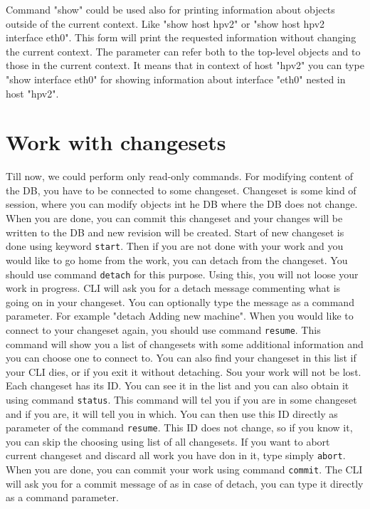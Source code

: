 \documentclass[deska]{subfiles}
\begin{document}
Command "show" could be used also for printing information about objects outside of the current context. Like "show host hpv2" or
"show host hpv2 interface eth0". This form will print the requested information without changing the current context.
The parameter can refer both to the top-level objects and to those in the current context. It means that in context of host "hpv2" you can type "show interface eth0"
for showing information about interface "eth0" nested in host "hpv2".

\section{Work with changesets}

Till now, we could perform only read-only commands. For modifying content of the DB, you have to be connected to some changeset.
Changeset is some kind of session, where you can modify objects int he DB where the DB does not change. When you are done,
you can commit this changeset and your changes will be written to the DB and new revision will be created.
Start of new changeset is done using keyword {\tt start}. Then if you are not done with your work and you would like to
go home from the work, you can detach from the changeset. You should use command {\tt detach} for this purpose. Using
this, you will not loose your work in progress. CLI will ask you for a detach message commenting what is going on in
your changeset. You can optionally type the message as a command parameter. For example "detach Adding new machine".
When you would like to connect to your changeset again, you should use command {\tt resume}. This command will show
you a list of changesets with some additional information and you can choose one to connect to. You can also find your
changeset in this list if your CLI dies, or if you exit it without detaching. Sou your work will not be lost. Each changeset has
its ID. You can see it in the list and you can also obtain it using command {\tt status}. This command will tel you
if you are in some changeset and if you are, it will tell you in which. You can then use this ID directly as parameter
of the command {\tt resume}. This ID does not change, so if you know it, you can skip the choosing using list of
all changesets. If you want to abort current changeset and discard all work you have don in it, type simply {\tt abort}.
When you are done, you can commit your work using command {\tt commit}. The CLI will ask you for a commit message of as
in case of detach, you can type it directly as a command parameter.
\end{document}
